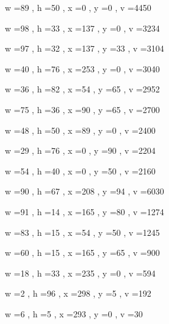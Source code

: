 \documentclass[11pt]{article}
\begin{document}
w =89 , h =50 , x =0 , y =0 , v =4450
\par
w =98 , h =33 , x =137 , y =0 , v =3234
\par
w =97 , h =32 , x =137 , y =33 , v =3104
\par
w =40 , h =76 , x =253 , y =0 , v =3040
\par
w =36 , h =82 , x =54 , y =65 , v =2952
\par
w =75 , h =36 , x =90 , y =65 , v =2700
\par
w =48 , h =50 , x =89 , y =0 , v =2400
\par
w =29 , h =76 , x =0 , y =90 , v =2204
\par
w =54 , h =40 , x =0 , y =50 , v =2160
\par
w =90 , h =67 , x =208 , y =94 , v =6030
\par
w =91 , h =14 , x =165 , y =80 , v =1274
\par
w =83 , h =15 , x =54 , y =50 , v =1245
\par
w =60 , h =15 , x =165 , y =65 , v =900
\par
w =18 , h =33 , x =235 , y =0 , v =594
\par
w =2 , h =96 , x =298 , y =5 , v =192
\par
w =6 , h =5 , x =293 , y =0 , v =30
\par
\newpage
\end{document}
